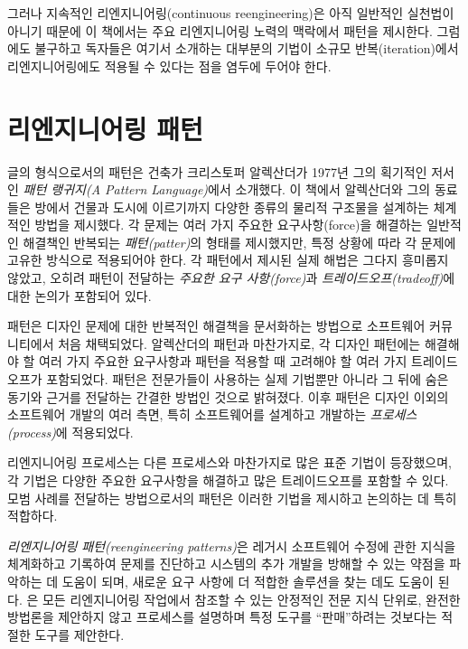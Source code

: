 \documentclass[a4paper,10pt,twoside]{book}
\begin{document}
그러나 지속적인 리엔지니어링(continuous reengineering)은 아직 일반적인 실천법이 아니기 때문에 이 책에서는 주요 리엔지니어링 노력의 맥락에서 패턴을 제시한다. 그럼에도 불구하고 독자들은 여기서 소개하는 대부분의 기법이 소규모 반복(iteration)에서 리엔지니어링에도 적용될 수 있다는 점을 염두에 두어야 한다.

\section{리엔지니어링 패턴}

글의 형식으로서의 패턴은 건축가 크리스토퍼 알렉산더가 1977년 그의 획기적인 저서인 \emph{패턴 랭귀지(A Pattern Language)}에서 소개했다. 이 책에서 알렉산더와 그의 동료들은 방에서 건물과 도시에 이르기까지 다양한 종류의 물리적 구조물을 설계하는 체계적인 방법을 제시했다. 각 문제는 여러 가지 주요한 요구사항(force)을 해결하는 일반적인 해결책인 반복되는 \emph{패턴(patter)}의 형태를 제시했지만, 특정 상황에 따라 각 문제에 고유한 방식으로 적용되어야 한다. 각 패턴에서 제시된 실제 해법은 그다지 흥미롭지 않았고, 오히려 패턴이 전달하는 \emph{주요한 요구 사항(force)}과 \emph{트레이드오프(tradeoff)}에 대한 논의가 포함되어 있다.

패턴은 디자인 문제에 대한 반복적인 해결책을 문서화하는 방법으로 소프트웨어 커뮤니티에서 처음 채택되었다. 알렉산더의 패턴과 마찬가지로, 각 디자인 패턴에는 해결해야 할 여러 가지 주요한 요구사항과 패턴을 적용할 때 고려해야 할 여러 가지 트레이드오프가 포함되었다. 패턴은 전문가들이 사용하는 실제 기법뿐만 아니라 그 뒤에 숨은 동기와 근거를 전달하는 간결한 방법인 것으로 밝혀졌다. 이후 패턴은 디자인 이외의 소프트웨어 개발의 여러 측면, 특히 소프트웨어를 설계하고 개발하는 \emph{프로세스(process)}에 적용되었다.

리엔지니어링 프로세스는 다른 프로세스와 마찬가지로 많은 표준 기법이 등장했으며, 각 기법은 다양한 주요한 요구사항을 해결하고 많은 트레이드오프를 포함할 수 있다. 모범 사례를 전달하는 방법으로서의 패턴은 이러한 기법을 제시하고 논의하는 데 특히 적합하다. 

\emph{리엔지니어링 패턴(reengineering patterns)}은 레거시 소프트웨어 수정에 관한 지식을 체계화하고 기록하여 문제를 진단하고 시스템의 추가 개발을 방해할 수 있는 약점을 파악하는 데 도움이 되며, 새로운 요구 사항에 더 적합한 솔루션을 찾는 데도 도움이 된다. 은 모든 리엔지니어링 작업에서 참조할 수 있는 안정적인 전문 지식 단위로, 완전한 방법론을 제안하지 않고 프로세스를 설명하며 특정 도구를 ``판매''하려는 것보다는 적절한 도구를 제안한다. 
\end{document}

